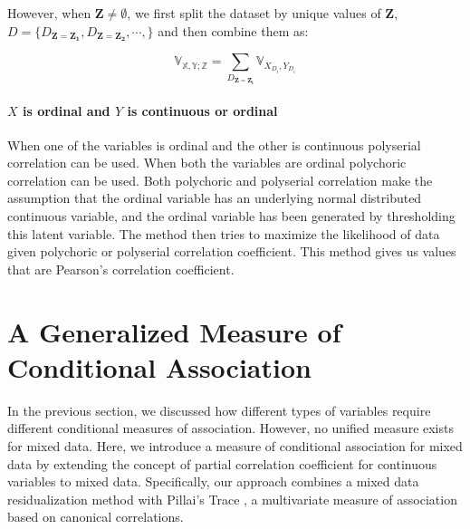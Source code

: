 \documentclass{uai2025} %
\begin{document}
However, when $ \bm{Z} \neq \emptyset $, we first split the dataset by unique
values of $ \bm{Z} $, $ D = \{D_{\bm{Z} = \bm{Z_1}}, D_{\bm{Z} = \bm{Z_2}},
\cdots, \} $  and then combine them as:

\begin{equation}
	\mathbb{V_{X, Y; Z}} = \sum_{D_{\bm{Z} = \bm{Z_i}}} \mathbb{V}_{X_{D_i}, Y_{D_i}}
\end{equation}

\paragraph{$ X $ is ordinal and $ Y $ is continuous or ordinal}
When one of the variables is ordinal and the other is continuous polyserial
correlation can be used. When both the variables are ordinal polychoric
correlation can be used. Both polychoric and polyserial correlation make the
assumption that the ordinal variable has an underlying normal distributed
continuous variable, and the ordinal variable has been generated by
thresholding this latent variable. The method then tries to maximize the
likelihood of data given polychoric or polyserial correlation coefficient. This
method gives us values that are Pearson's correlation coefficient.

\section{A Generalized Measure of Conditional Association}
\label{sec:mixed_association}

In the previous section, we discussed how different types of variables require
different conditional measures of association. However, no unified measure
exists for mixed data. Here, we introduce a measure of conditional association
for mixed data by extending the concept of partial correlation coefficient for
continuous variables to mixed data. Specifically, our approach combines a mixed
data residualization method \citep{Ankan2023} with Pillai's Trace
\citep{Pillai1955}, a multivariate measure of association based on canonical
correlations.
 
\end{document}
